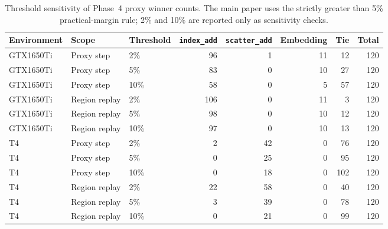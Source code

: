 \begin{table}[!htbp]
\centering\footnotesize
\caption{Threshold sensitivity of Phase~4 proxy winner counts. The main paper uses the strictly greater than 5\% practical-margin rule; 2\% and 10\% are reported only as sensitivity checks.}
\label{tab:threshold-sensitivity-phase4}
\setlength{\tabcolsep}{3pt}
\renewcommand{\arraystretch}{1.12}
\begin{tabular}{lllrrrrr}
\toprule
Environment & Scope & Threshold & \texttt{index\_add} & \texttt{scatter\_add} & Embedding & Tie & Total \\
\midrule
GTX1650Ti & Proxy step & 2\% & 96 & 1 & 11 & 12 & 120 \\
GTX1650Ti & Proxy step & 5\% & 83 & 0 & 10 & 27 & 120 \\
GTX1650Ti & Proxy step & 10\% & 58 & 0 & 5 & 57 & 120 \\
GTX1650Ti & Region replay & 2\% & 106 & 0 & 11 & 3 & 120 \\
GTX1650Ti & Region replay & 5\% & 98 & 0 & 10 & 12 & 120 \\
GTX1650Ti & Region replay & 10\% & 97 & 0 & 10 & 13 & 120 \\
T4 & Proxy step & 2\% & 2 & 42 & 0 & 76 & 120 \\
T4 & Proxy step & 5\% & 0 & 25 & 0 & 95 & 120 \\
T4 & Proxy step & 10\% & 0 & 18 & 0 & 102 & 120 \\
T4 & Region replay & 2\% & 22 & 58 & 0 & 40 & 120 \\
T4 & Region replay & 5\% & 3 & 39 & 0 & 78 & 120 \\
T4 & Region replay & 10\% & 0 & 21 & 0 & 99 & 120 \\
\bottomrule
\end{tabular}
\end{table}
